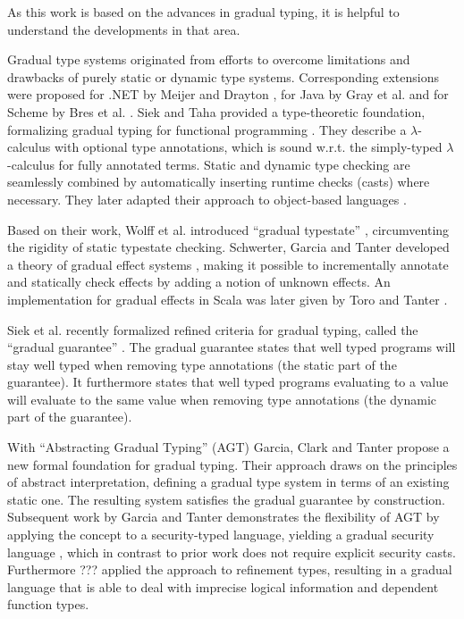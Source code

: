 As this work is based on the advances in gradual typing, it is helpful to understand the developments in that area.

Gradual type systems originated from efforts to overcome limitations and drawbacks of purely static or dynamic type systems.
Corresponding extensions were proposed for .NET by Meijer and Drayton \cite{meijer2004static}, for Java by Gray et al. \cite{gray2005fine} and for Scheme by Bres et al. \cite{bres2004compiling}.
Siek and Taha provided a type-theoretic foundation, formalizing gradual typing for functional programming \cite{siek2006gradual}.
They describe a $\lambda$-calculus with optional type annotations, which is sound w.r.t. the simply-typed $\lambda$-calculus for fully annotated terms.
Static and dynamic type checking are seamlessly combined by automatically inserting runtime checks (casts) where necessary.
They later adapted their approach to object-based languages \cite{siek2007gradual}.

Based on their work, Wolff et al. introduced “gradual typestate” \cite{wolff2011gradual}, circumventing the rigidity of static typestate checking.
Schwerter, Garcia and Tanter developed a theory of gradual effect systems \cite{banados2014theory}, making it possible to incrementally annotate and statically check effects by adding a notion of unknown effects.
An implementation for gradual effects in Scala was later given by Toro and Tanter \cite{toro2015customizable}.

\label{grad-guarantee}
Siek et al. recently formalized refined criteria for gradual typing, called the “gradual guarantee” \cite{siek2015refined}.
The gradual guarantee states that well typed programs will stay well typed when removing type annotations (the static part of the guarantee).
It furthermore states that well typed programs evaluating to a value will evaluate to the same value when removing type annotations (the dynamic part of the guarantee).

With “Abstracting Gradual Typing” (AGT) \cite{garcia2016abstracting} Garcia, Clark and Tanter propose a new formal foundation for gradual typing.
Their approach draws on the principles of abstract interpretation, defining a gradual type system in terms of an existing static one.
The resulting system satisfies the gradual guarantee by construction.
Subsequent work by Garcia and Tanter demonstrates the flexibility of AGT by applying the concept to a security-typed language, yielding a gradual security language \cite{garcia2015deriving}, which in contrast to prior work does not require explicit security casts.
Furthermore ??? \cite{nico} applied the approach to refinement types, resulting in a gradual language that is able to deal with imprecise logical information and dependent function types.